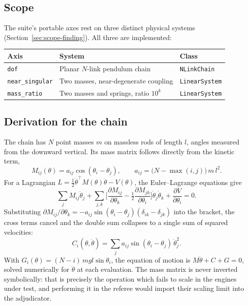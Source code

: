 \documentclass[11pt,a4paper]{article}
\begin{document}
\subsection{Scope}

The suite's portable axes rest on three distinct physical systems
(Section~\ref{sec:scope-finding}). All three are implemented:

\begin{center}
\begin{tabular}{@{}lL{0.36\textwidth}l@{}}
\toprule
\textbf{Axis} & \textbf{System} & \textbf{Class} \\
\midrule
\texttt{dof}            & Planar $N$-link pendulum chain          & \texttt{NLinkChain} \\
\texttt{near\_singular} & Two masses, near-degenerate coupling     & \texttt{LinearSystem} \\
\texttt{mass\_ratio}    & Two masses and springs, ratio $10^{k}$   & \texttt{LinearSystem} \\
\bottomrule
\end{tabular}
\end{center}

\subsection{Derivation for the chain}

The chain has $N$ point masses $m$ on massless rods of length $l$, angles
measured from the downward vertical. Its mass matrix follows directly from the
kinetic term,
\begin{equation}
M_{ij}(\theta) = a_{ij}\cos(\theta_i - \theta_j),
\qquad a_{ij} = \big(N - \max(i,j)\big)\,m\,l^{2}.
\end{equation}
For a Lagrangian $L = \tfrac12\dot\theta^{\top}M(\theta)\dot\theta - V(\theta)$,
the Euler--Lagrange equations give
\begin{equation}
\sum_j M_{ij}\ddot\theta_j
 + \sum_{j,k}\Big[\frac{\partial M_{ij}}{\partial\theta_k}
                  - \tfrac12\frac{\partial M_{jk}}{\partial\theta_i}\Big]
   \dot\theta_j\dot\theta_k
 + \frac{\partial V}{\partial\theta_i} = 0 .
\label{eq:el}
\end{equation}
Substituting $\partial M_{ij}/\partial\theta_k
= -a_{ij}\sin(\theta_i-\theta_j)(\delta_{ik}-\delta_{jk})$ into the bracket,
the cross terms cancel and the double sum collapses to a single sum of squared
velocities:
\begin{equation}
C_i(\theta,\dot\theta) = \sum_j a_{ij}\sin(\theta_i-\theta_j)\,\dot\theta_j^{2}.
\label{eq:coriolis}
\end{equation}
With $G_i(\theta) = (N-i)\,mgl\sin\theta_i$, the equation of motion is
$M\ddot\theta + C + G = 0$, solved numerically for $\ddot\theta$ at each
evaluation. The mass matrix is never inverted symbolically: that is precisely
the operation which fails to scale in the engines under test, and performing it
in the referee would import their scaling limit into the adjudicator.
\end{document}
